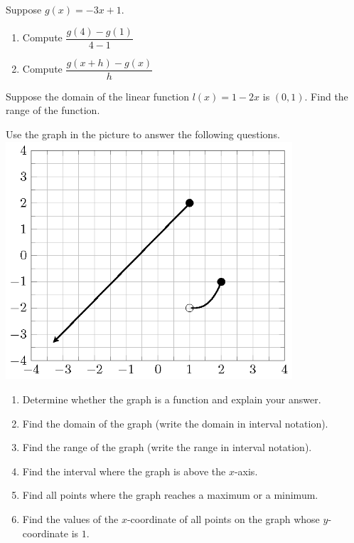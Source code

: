 \begin{exercise}

Suppose \(g(x) = -3x + 1\).

\begin{enumerate}
\item
  Compute \(\dfrac{g(4)-g(1)}{4-1}\)
\item
  Compute \(\dfrac{g(x+h)-g(x)}{h}\)
\end{enumerate}

\end{exercise}

\begin{exercise}
Suppose the domain of the linear function \(l(x)=1-2x\) is \((0, 1)\).
Find the range of the function.
\end{exercise}
\vspace*{5\baselineskip}

\begin{exercise}

Use the graph in the picture to answer the following questions.
\\
\includegraphics[width=0.8\textwidth]{figs/function-exercise-ray-cubic.png}

\begin{enumerate}[twocol]
\item
  Determine whether the graph is a function and explain your answer.
\item
  Find the domain of the graph (write the domain in interval notation).
\item
  Find the range of the graph (write the range in interval notation).

  \columnbreak

\item
  Find the interval where the graph is above the \(x\)-axis.
\item
  Find all points where the graph reaches a maximum or a minimum.
\item
  Find the values of the \(x\)-coordinate of all points on the graph
  whose \(y\)-coordinate is \(1\).
\end{enumerate}
\end{exercise}
\vspace*{2\baselineskip}

